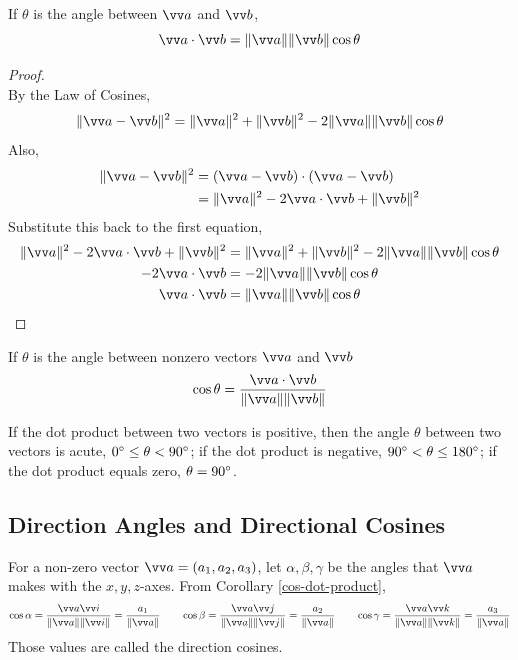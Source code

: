 \begin{theorem}
If $\theta$ is the angle between $\vv a$ and $\vv b$,
$$
\vv a \cdot \vv b = \norm{\vv a}\norm{\vv b}\cos\theta
$$

\begin{proof}
\hfill \\
By the Law of Cosines,
$$
\norm{\vv a -\vv b}^2 = \norm{\vv a}^2 + \norm{\vv b}^2  - 2\norm{\vv a}\norm{\vv b}\cos\theta
$$
Also,
\begin{align*}
    \norm{\vv a-\vv b}^2 &= (\vv a - \vv b)\cdot (\vv a - \vv b) \\
    &= \norm{\vv a}^2 - 2\vv a \cdot \vv b + \norm{\vv b}^2
\end{align*}
Substitute this back to the first equation,
\begin{align*}
    \norm{\vv a}^2 - 2\vv a \cdot \vv b + \norm{\vv b}^2 &= \norm{\vv a}^2 + \norm{\vv b}^2  - 2\norm{\vv a}\norm{\vv b}\cos\theta \\
    - 2\vv a \cdot \vv b &= - 2\norm{\vv a}\norm{\vv b}\cos\theta \\
    \vv a \cdot \vv b &= \norm{\vv a}\norm{\vv b}\cos\theta
\end{align*}
\end{proof}
\end{theorem}

\begin{corollary}\label{cos-dot-product}
If $\theta$ is the angle between nonzero vectors $\vv a$ and $\vv b$
$$
\cos\theta = \frac{\vv a \cdot \vv b}{\norm{\vv a}\norm{\vv b}}
$$
\end{corollary}

If the dot product between two vectors is positive, then the angle $\theta$ between two vectors is acute, $0\degree \leq \theta < 90\degree$; if the dot product is negative, $90\degree < \theta \leq 180\degree$; if the dot product equals zero, $\theta = 90\degree$.

\subsection{Direction Angles and Directional Cosines}

\begin{definition}
For a non-zero vector $\vv a = (a_1,a_2,a_3)$, let $\alpha,\beta,\gamma$ be the angles that $\vv a$ makes with the $x,y,z$-axes. From Corollary \ref{cos-dot-product},
$$
\cos\alpha = \frac{\vv a \vv i}{\norm{\vv a}\norm{\vv i}} = \frac{a_1}{\norm{\vv a}} \qquad \cos\beta = \frac{\vv a \vv j}{\norm{\vv a}\norm{\vv j}} = \frac{a_2}{\norm{\vv a}} \qquad \cos\gamma = \frac{\vv a \vv k}{\norm{\vv a}\norm{\vv k}} = \frac{a_3}{\norm{\vv a}}
$$
Those values are called the direction cosines.
\end{definition}

